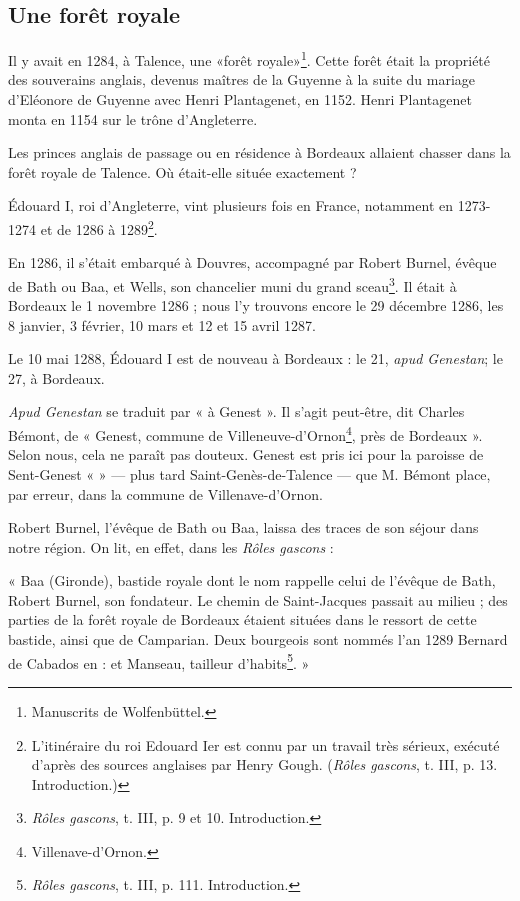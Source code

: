 \subsection{Une forêt royale}

Il y avait en 1284, à Talence, une «forêt royale»\footnote{Manuscrits de Wolfenbüttel.}. Cette forêt était la propriété des souverains anglais, devenus maîtres de la Guyenne à la suite du mariage d'Eléonore de Guyenne avec Henri Plantagenet, en 1152. Henri Plantagenet monta en 1154 sur le trône d'Angleterre.

Les princes anglais de passage ou en résidence à Bordeaux allaient chasser dans la forêt royale de Talence. Où était-elle située exactement ?

Édouard I\ier{}, roi d'Angleterre, vint plusieurs fois en France, notamment en 1273-1274 et de 1286 à 1289\footnote{L'itinéraire du roi Edouard Ier est connu par un travail très sérieux, exécuté d'après des sources anglaises par Henry Gough. (\textit{Rôles gascons}, t. III, p. 13. Introduction.)}.

En 1286, il s'était embarqué à Douvres, accompagné par Robert Burnel, évêque de Bath ou Baa, et Wells, son chancelier muni du grand sceau\footnote{\textit{Rôles gascons}, t. III, p. 9 et 10. Introduction.}. Il était à Bordeaux le 1\ier{} novembre 1286 ; nous l'y trouvons encore le 29 décembre 1286, les 8 janvier, 3 février, 10 mars et 12 et 15 avril 1287.

Le 10 mai 1288, Édouard I\ier{} est de nouveau à Bordeaux : le 21, \textit{apud Genestan}; le 27, à Bordeaux.

\textit{Apud Genestan} se traduit par « à Genest ». Il s'agit peut-être, dit Charles Bémont, de « Genest, commune de Villeneuve-d'Ornon\footnote{Villenave-d'Ornon.}, près de Bordeaux ». Selon nous, cela ne paraît pas douteux. Genest est pris ici pour la paroisse de Sent-Genest « » — plus tard Saint-Genès-de-Talence — que M. Bémont place, par erreur, dans la commune de Villenave-d'Ornon.

Robert Burnel, l'évêque de Bath ou Baa, laissa des traces de son séjour dans notre région. On lit, en effet, dans les \textit{Rôles gascons} :

« Baa (Gironde), bastide royale dont le nom rappelle celui de l'évêque de Bath, Robert Burnel, son fondateur. Le chemin de Saint-Jacques passait au milieu ; des parties de la forêt royale de Bordeaux étaient situées dans le ressort de cette bastide, ainsi que de Camparian. Deux bourgeois sont nommés l'an 1289 Bernard de Cabados en : et Manseau, tailleur d'habits\footnote{\textit{Rôles gascons}, t. III, p. 111. Introduction.}. »

